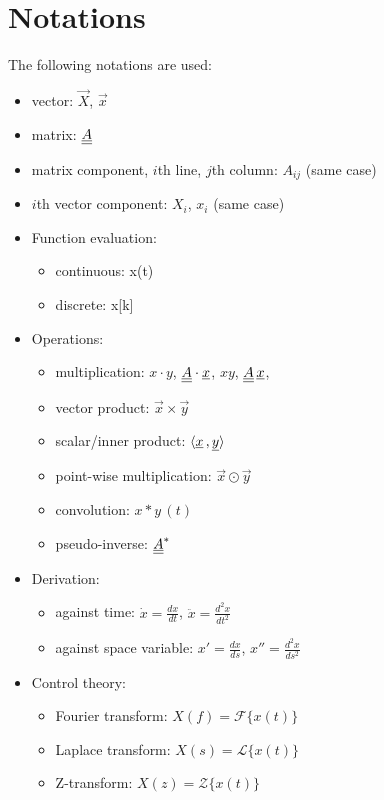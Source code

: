 
\chapter*{Notations}

The following notations are used:

\begin{itemize}
	\item vector: $\vec{X}$, $\vec{x}$
	\item matrix: $\underline{\underline{A}}$
	\item matrix component, $i$th line, $j$th column: $A_{ij}$ (same case)
	\item $i$th vector component: $X_i$, $x_i$ (same case)
	\item Function evaluation:
	\begin{itemize}
		\item continuous: x(t)
		\item discrete: x[k]
	\end{itemize}
	\item Operations:
	\begin{itemize}
		\item multiplication: $x \cdot y$, $\underline{\underline{A}} \cdot \underline{x}$, $xy$, $\underline{\underline{A}} \, \underline{x}$, 
		\item vector product: $\vec{x} \times \vec{y}$
		\item scalar/inner product: $\langle \underline{x} {\,,\,} \underline{y} \rangle$
		\item point-wise multiplication: $\vec{x} \odot \vec{y}$
		\item convolution: $x * y\, (t)$
		\item pseudo-inverse: $\underline{\underline{A}}^*$
	\end{itemize}
	\item Derivation:
	\begin{itemize}
		\item against time: $\dot{x} = \frac{dx}{dt}$, $\ddot{x} = \frac{d^2 x}{dt^2}$
		\item against space variable: $x' = \frac{dx}{ds}$, $x'' = \frac{d^2 x}{ds^2}$
	\end{itemize}
	\item Control theory:
	\begin{itemize}
		\item Fourier transform: $X(f) = \mathcal{F}\{x(t)\}$
		\item Laplace transform: $X(s) = \mathcal{L}\{x(t)\}$
		\item Z-transform: $X(z) = \mathcal{Z}\{x(t)\}$
	\end{itemize}
\end{itemize}

